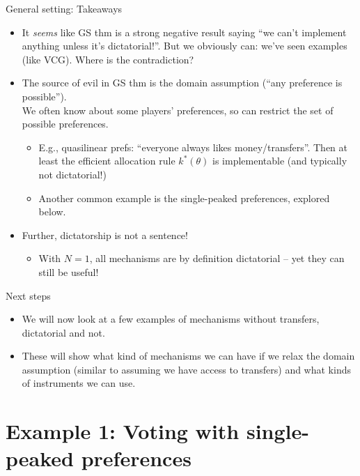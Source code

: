 \documentclass[english,10pt
,aspectratio=169
]{beamer}
\begin{document}
\begin{frame}{General setting: Takeaways}
	\begin{itemize}
		\item It \emph{seems} like GS thm is a strong negative result saying ``we can't implement anything unless it's dictatorial!''. But we obviously can: we've seen examples (like VCG). Where is the contradiction?
		\pause 
		\item The source of evil in GS thm is the \alert{domain} assumption (``any preference is possible''). \\
		We often know  about some players' preferences, so can restrict the set of possible preferences.
		\begin{itemize}
			\item E.g., quasilinear prefs: ``everyone always likes money/transfers''. Then at least the efficient allocation rule $k^*(\theta)$ is implementable (and typically not dictatorial!)
			\item Another common example is the single-peaked preferences, explored below. %
		\end{itemize}
		\pause
		\item Further, dictatorship is not a sentence!
		\begin{itemize}
			\item With $N=1$, all mechanisms are by definition dictatorial -- yet they can still be useful!
		\end{itemize}
	\end{itemize}
\end{frame}


\begin{frame}{Next steps}
	\begin{itemize}
		\item We will now look at a few examples of mechanisms without transfers, dictatorial and not. 
		\item These will show what kind of mechanisms we can have if we relax the domain assumption (similar to assuming we have access to transfers) and what kinds of instruments we can use.
	\end{itemize}
\end{frame}



\section{Example 1: Voting with single-peaked preferences}
\end{document}
